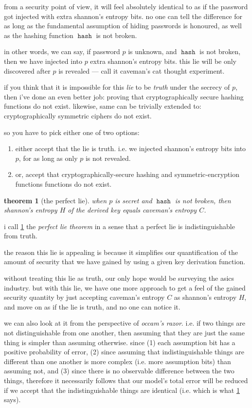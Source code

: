 \documentclass[twocolumn]{article}
\newtheorem{theorem}{theorem}
\DeclareMathOperator{\hash}{\mathtt{hash}}
\begin{document}
from a security point of view, it will feel absolutely identical to as if
the password got injected with extra shannon's entropy bits.  no one can
tell the difference for as long as the fundamental assumption of hiding
passwords is honoured, as well as the hashing function $\hash$ is not
broken.

in other words, we can say, if password $p$ is unknown, and $\hash$ is not
broken, then we have injected into $p$ extra shannon's entropy bits.  this
lie will be only discovered after $p$ is revealed ---  call it caveman's
cat thought experiment.

if you think that it is impossible for this \emph{lie} to be \emph{truth}
under the secrecy of $p$, then i've done an even better job: proving that
cryptographically secure hashing functions do not exist.  likewise, same
can be trivially extended to: cryptographically symmetric ciphers do not
exist.

so you have to pick either one of two options:
\begin{enumerate}
    \item either accept that the lie is truth.  i.e. we injected shannon's
    entropy bits into $p$, for as long as only $p$ is not revealed.
    \item or, accept that cryptographically-secure hashing and
    symmetric-encryption functions functions do not exist.
\end{enumerate}

\begin{theorem}[the perfect lie]\label{theorem_perfect_lie}
when $p$ is secret and $\hash$ is not broken, then shannon's entropy $H$ of
the derived key equals caveman's entropy $C$.
\end{theorem}

i call \cref{theorem_perfect_lie} the \emph{perfect lie theorem} in a sense
that a perfect lie is indistinguishable from truth.

the reason this lie is appealing is because it simplifies our
quantification of the amount of security that we have gained by using a
given key derivation function.

without treating this lie as truth, our only hope would be surveying the
asics industry.  but with this lie, we have one more approach to get a feel
of the gained security quantity by just accepting caveman's entropy $C$ as
shannon's entropy $H$, and move on as if the lie is truth, and no one can
notice it.

we can also look at it from the perspective of \emph{occam's razor}.  i.e.
if two things are not distinguishable from one another, then assuming that
they are just the same thing is simpler than assuming otherwise.  since (1)
each assumption bit has a positive probability of error, (2) since assuming
that indistinguishable things are different than one another is more
complex (i.e. more assumption bits) than assuming not, and (3) since there
is no observable difference between the two things, therefore it
necessarily follows that our model's total error will be reduced if we
accept that the indistinguishable things are identical (i.e.  which is what
\cref{theorem_perfect_lie} says).
\end{document}
